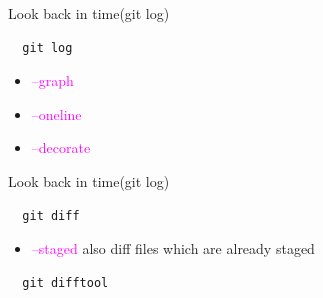 \documentclass{beamer}
\begin{document}
\begin{frame}[fragile,t]{Look back in time(git log)}\vspace{10pt}
  \begin{lstlisting}
  git log \end{lstlisting}
  \begin{itemize}
    \item \textcolor{magenta}{--graph } 
    \item \textcolor{magenta}{--oneline} 
    \item \textcolor{magenta}{--decorate} 
  \end{itemize}
\end{frame}


\begin{frame}[fragile,t]{Look back in time(git log)}\vspace{10pt}
  \begin{lstlisting}
  git diff\end{lstlisting}
  \begin{itemize}
    \item \textcolor{magenta}{--staged} also diff files which are already staged
  \end{itemize}
  \begin{lstlisting}
  git difftool\end{lstlisting}
\end{frame}
\end{document}
